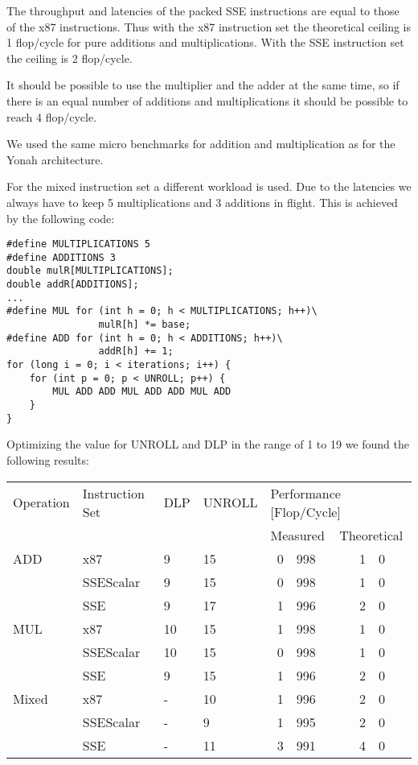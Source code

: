 \documentclass[a4paper,12pt]{report}
\begin{document}
The throughput and latencies of the packed SSE instructions are equal to those
of the x87 instructions. Thus with the x87 instruction set the theoretical
ceiling is 1 flop/cycle for pure additions and multiplications. With the SSE
instruction set the ceiling is 2 flop/cycle.

It should be possible to use the multiplier and the adder at the same time, so
if there is an equal number of additions and multiplications it should be
possible to reach 4 flop/cycle.

We used the same micro benchmarks for addition and multiplication as for the
Yonah architecture. 

For the mixed instruction set a different workload is used. Due to the latencies
we always have to keep 5 multiplications and 3 additions in flight. This is
achieved by the following code:

\begin{lstlisting}
#define MULTIPLICATIONS 5
#define ADDITIONS 3
double mulR[MULTIPLICATIONS];
double addR[ADDITIONS];
...
#define MUL for (int h = 0; h < MULTIPLICATIONS; h++)\
				mulR[h] *= base;
#define ADD for (int h = 0; h < ADDITIONS; h++)\
				addR[h] += 1;
for (long i = 0; i < iterations; i++) {
	for (int p = 0; p < UNROLL; p++) {
		MUL ADD ADD MUL ADD ADD MUL ADD
	}
}
\end{lstlisting}


Optimizing the value for UNROLL and DLP in the range of 1 to 19 we found the
following results:

\begin{center}
\begin{tabular}{llllr@{.}lr@{.}l}
\toprule
Operation&Instruction Set & DLP & UNROLL &  \multicolumn{4}{l}{Performance
[Flop/Cycle]} \\ \cmidrule{5-8}
&&&&\multicolumn{2}{l}{Measured}&\multicolumn{2}{l}{Theoretical}\\
\midrule
ADD   & x87       &  9 & 15 & 0&998 & 1&0\\
      & SSEScalar &  9 & 15 & 0&998 & 1&0\\
      & SSE       &  9 & 17 & 1&996 & 2&0\\
MUL   & x87       & 10 & 15 & 1&998 & 1&0\\
      & SSEScalar & 10 & 15 & 0&998 & 1&0\\
      & SSE       &  9 & 15 & 1&996 & 2&0\\
Mixed & x87       &  - & 10 & 1&996 & 2&0\\
      &SSEScalar  &  - &  9 & 1&995 & 2&0\\
      &SSE        &  - & 11 & 3&991 & 4&0\\
\bottomrule
\end{tabular}
\end{center}
\end{document}
